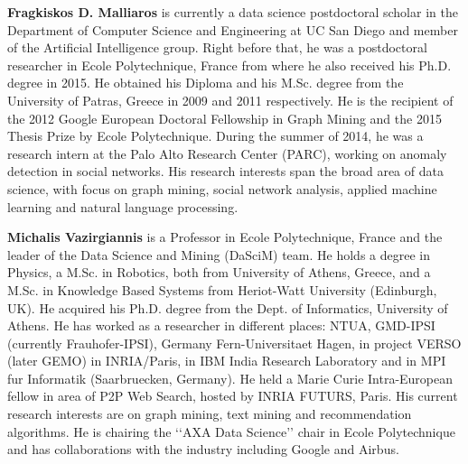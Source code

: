 \begin{bio}
\textbf{Fragkiskos D. Malliaros} is currently a data science postdoctoral scholar in the Department of Computer Science and Engineering at UC San Diego and member of the Artificial Intelligence group. Right before that, he was a postdoctoral researcher in Ecole Polytechnique, France from where he also received his Ph.D. degree in 2015. He obtained his Diploma and his M.Sc. degree from the University of Patras, Greece in 2009 and 2011 respectively. He is the recipient of the 2012 Google European Doctoral Fellowship in Graph Mining and the 2015 Thesis Prize by Ecole Polytechnique. During the summer of 2014, he was a research intern at the Palo Alto Research Center (PARC), working on anomaly detection in social networks. His research interests span the broad area of data science, with focus on graph mining, social network analysis, applied machine learning and natural language processing.

\textbf{Michalis Vazirgiannis} is a Professor in Ecole Polytechnique, France and the leader of the Data Science and Mining (DaSciM) team. He holds a degree in Physics, a M.Sc. in Robotics, both from University of Athens, Greece, and a M.Sc. in Knowledge Based Systems from Heriot-Watt University (Edinburgh, UK). He acquired his Ph.D. degree from the Dept. of Informatics, University of Athens. He has worked as a researcher in different places: NTUA, GMD-IPSI (currently Frauhofer-IPSI), Germany Fern-Universitaet Hagen, in project VERSO (later GEMO) in INRIA/Paris, in IBM India Research Laboratory and in MPI fur Informatik (Saarbruecken, Germany). He held a Marie Curie Intra-European fellow in area of P2P Web Search, hosted by INRIA FUTURS, Paris. His current research interests are on graph mining, text mining and recommendation algorithms. He is chairing the ‘‘AXA Data Science’’ chair in Ecole Polytechnique and has collaborations with the industry including Google and Airbus.
\end{bio}

